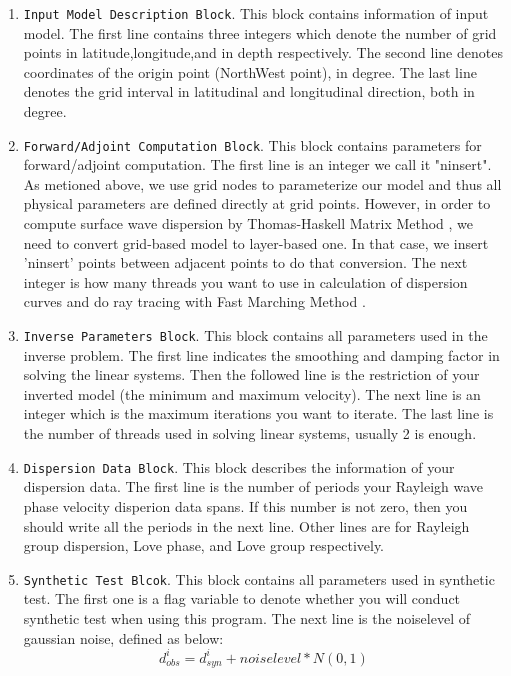 \documentclass[UTF8]{article}
\begin{document}
\begin{enumerate}
    \item \texttt{Input Model Description Block}. This block 
    contains information of input model. The first line contains 
    three integers which denote the number of grid points
    in latitude,longitude,and in 
    depth respectively. The second line denotes coordinates 
    of the origin point (NorthWest point), in degree. The last 
    line denotes the grid interval in latitudinal and 
    longitudinal direction, both in degree.
    
    \item \texttt{Forward/Adjoint Computation Block}. This 
    block contains parameters for forward/adjoint computation.
    The first line is an integer we call it "ninsert". 
    As metioned above, we use grid nodes to parameterize 
    our model and thus all physical parameters are defined directly 
    at grid points. However, in order to compute surface wave 
    dispersion by Thomas-Haskell Matrix Method \citep{Haskell53,schwab1972},
    we need to convert grid-based model to layer-based one. In that 
    case, we insert 'ninsert' points between adjacent points to do 
    that conversion. The next integer is how many threads you 
    want to use in calculation of dispersion curves and do 
    ray tracing with Fast Marching Method \citep{rawlinson2004}. 

    \item \texttt{Inverse Parameters Block}. This block contains 
    all parameters used in the inverse problem. The first line indicates 
    the smoothing and damping factor in solving the linear systems.
    Then the followed line is the restriction of your  
    inverted model (the minimum and maximum velocity). The next line 
    is an integer which is the maximum iterations you want to iterate. The
    last line is the number of threads used in solving linear 
    systems, usually 2 is enough.
    
    \item \texttt{Dispersion Data Block}. This block describes 
    the information of your dispersion data. The first line is 
    the number of periods your Rayleigh wave phase velocity
    disperion data spans. If this number is not zero, then you 
    should write all the periods in the next line. Other lines 
    are for Rayleigh group dispersion, Love phase, and Love group 
    respectively.

    \item \texttt{Synthetic Test Blcok}. This block contains all 
    parameters used in synthetic test. The first one is a flag variable
    to denote whether you will conduct synthetic test when using this 
    program. The next line is the noiselevel of gaussian noise, 
    defined as below:
    \[   
        d_{obs}^i = d_{syn}^i +  noiselevel * N(0,1)
    \]

\end{enumerate}
\end{document}

